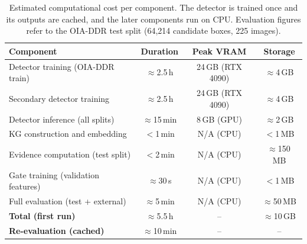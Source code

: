 \begin{table}[htbp]
\centering
\caption{Estimated computational cost per component. The detector is trained once and
  its outputs are cached, and the later components run on CPU. Evaluation figures refer to
  the OIA-DDR test split (64{,}214 candidate boxes, 225 images).}
\label{tab:computational_cost}
\small
\setlength{\tabcolsep}{5pt}
\begin{tabular}{@{}lccc@{}}
\toprule
\textbf{Component} & \textbf{Duration} & \textbf{Peak VRAM} & \textbf{Storage} \\
\midrule
Detector training (OIA-DDR train)    & $\approx$2.5\,h  & 24\,GB (RTX 4090)  & $\approx$4\,GB \\
Secondary detector training          & $\approx$2.5\,h  & 24\,GB (RTX 4090)  & $\approx$4\,GB \\
Detector inference (all splits)      & $\approx$15\,min & 8\,GB (GPU)        & $\approx$2\,GB \\
KG construction and embedding        & $<$1\,min        & N/A (CPU)          & $<$1\,MB \\
Evidence computation (test split)    & $<$2\,min        & N/A (CPU)          & $\approx$150\,MB \\
Gate training (validation features)  & $\approx$30\,s       & N/A (CPU)          & $<$1\,MB \\
Full evaluation (test + external)    & $\approx$5\,min  & N/A (CPU)          & $\approx$50\,MB \\
\midrule
\textbf{Total (first run)}           & $\approx$5.5\,h & --        & $\approx$10\,GB \\
\textbf{Re-evaluation (cached)}      & $\approx$10\,min & --       & -- \\
\bottomrule
\end{tabular}
\end{table}
